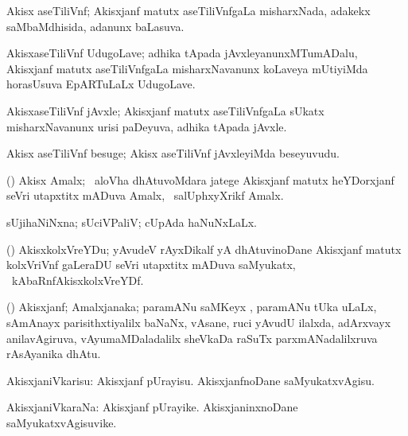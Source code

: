 \bentry
{}
\gl{\gu}
\bmng
Akisx aseTiliVnf; Akisxjanf matutx aseTiliVnfgaLa misharxNada, adakekx saMbaMdhisida, adanunx baLasuva. 
\emng
\eentry

\bentry
{}
\gl{\nA}
\bmng
AkisxaseTiliVnf UdugoLave; adhika tApada jAvxleyanunxMTumADalu, Akisxjanf matutx aseTiliVnfgaLa misharxNavanunx koLaveya mUtiyiMda horasUsuva EpARTuLaLx UdugoLave.  
\emng
\eentry

\bentry
{}
\gl{\nA}
\bmng
AkisxaseTiliVnf jAvxle; Akisxjanf matutx aseTiliVnfgaLa sUkatx misharxNavanunx urisi paDeyuva, adhika tApada jAvxle. 
\emng
\eentry

\bentry
{}
\gl{\nA}
\bmng
Akisx aseTiliVnf besuge; Akisx aseTiliVnf jAvxleyiMda beseyuvudu. 
\emng
\eentry

\bentry
{}
\gl{\nA}
\bmng
(\ravi) Akisx Amalx; \sA\ aloVha dhAtuvoMdara jatege Akisxjanf matutx heYDorxjanf seVri utapxtitx mADuva Amalx, \udA\ salUphxyXrikf Amalx. 
\emng
\eentry

\bentry
{}
\gl{\gu}
\bmng
sUjihaNiNxna; sUciVPaliV; cUpAda haNuNxLaLx. 
\emng
\eentry

\bentry
{}
\gl{\nA}
\bmng
(\ravi) AkisxkolxVreYDu; yAvudeV rAyxDikalf yA dhAtuvinoDane Akisxjanf matutx kolxVriVnf gaLeraDU seVri utapxtitx mADuva saMyukatx, \udA\ kAbaRnfAkisxkolxVreYDf. 
\emng
\eentry

\bentry
{}
\gl{\nA}
\bmng
(\ravi) Akisxjanf; Amalxjanaka; paramANu saMKeyx , paramANu tUka  uLaLx, sAmAnayx parisithxtiyalilx baNaNx, vAsane, ruci yAvudU ilalxda, adArxvayx anilavAgiruva, vAyumaMDaladalilx sheVkaDa raSuTx parxmANadalilxruva rAsAyanika dhAtu. 
\emng
\eentry

\bentry
{}
\gl{\sakirx}
\bmng
AkisxjaniVkarisu: 
\hypertarget{oxygenate(a)}{} 
\banum
{} Akisxjanf pUrayisu. 
 AkisxjanfnoDane saMyukatxvAgisu. 
\eanum
\emng
\eentry

\bentry
{}
\gl{\nA}
\bmng
AkisxjaniVkaraNa: 
\banum
{} Akisxjanf pUrayike. 
 AkisxjaninxnoDane saMyukatxvAgisuvike. 
\eanum
\emng
\eentry

